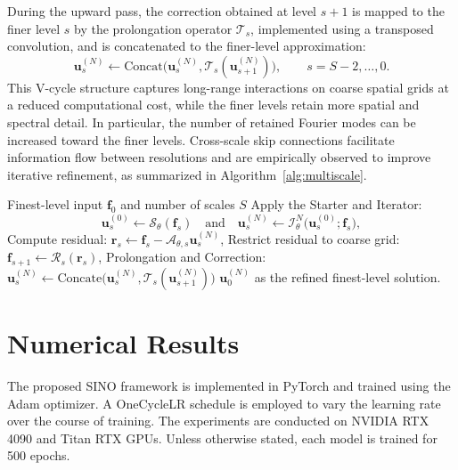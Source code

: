\documentclass[preprint,numbers,sort&compress]{elsarticle}
\begin{document}
		During the upward pass, the correction obtained at level $s+1$ is mapped to the finer level $s$ by the prolongation operator $\mathcal T_s$, implemented using a transposed convolution, and is concatenated to the finer-level approximation:
		\[
		\boldsymbol u_s^{(N)}
		\leftarrow
		\text{Concat} \big(\boldsymbol{u}^{(N)}_{s},  \mathcal T_s (\boldsymbol u_{s+1}^{(N)})\big) ,
		\qquad
		s=S-2,\ldots,0.
		\]
		This V-cycle structure captures long-range interactions on coarse spatial grids at a reduced computational cost, while the finer levels retain more spatial and spectral detail. In particular, the number of retained Fourier modes can be increased toward the finer levels. Cross-scale skip connections facilitate information flow between resolutions and are empirically observed to improve iterative refinement, as summarized in Algorithm~\ref{alg:multiscale}. 
		
		
		\begin{algorithm}[htbp]
			\caption{Data flow in Starter-Iterator Neural Operator}
			\label{alg:multiscale}
			\begin{algorithmic}[1]
				\Require Finest-level input $\boldsymbol f_0$ and number of scales $S$
				 
				\State Apply the Starter and Iterator:
				\begin{equation*}
					\boldsymbol u_s^{(0)}
					\gets \mathcal S_\theta(\boldsymbol f_s) \quad \mbox{and}\quad
					\boldsymbol u_s^{(N)}
					\gets\mathcal I_\theta^N
					\big(\boldsymbol u_s^{(0)};\boldsymbol f_s\big),
				\end{equation*}
				\State Compute residual: $\boldsymbol r_s
				\gets \boldsymbol f_s-\mathcal A_{\theta,s}\boldsymbol u_s^{(N)}$,
				\State Restrict residual to coarse grid: $\boldsymbol f_{s+1}\gets \mathcal R_s(\boldsymbol r_s)$,
				\EndIf
				\EndFor
				 
				\State Prolongation and Correction: $\boldsymbol{u}^{(N)}_{s} \gets \text{Concate}\big(\boldsymbol{u}^{(N)}_{s},  \mathcal T_s (\boldsymbol u_{s+1}^{(N)})\big)$ 
				\EndFor
				\State \Return $\boldsymbol u_0^{(N)}$ as the refined finest-level solution.
			\end{algorithmic}
		\end{algorithm}
		
		
		\section{Numerical Results}\label{sec3}
		The proposed SINO framework is implemented in PyTorch and trained using the Adam optimizer. A OneCycleLR schedule is employed to vary the learning rate over the course of training. The experiments are conducted on NVIDIA RTX
		4090 and Titan RTX GPUs. Unless otherwise stated, each model is trained for 500 epochs. 
		
\end{document}
